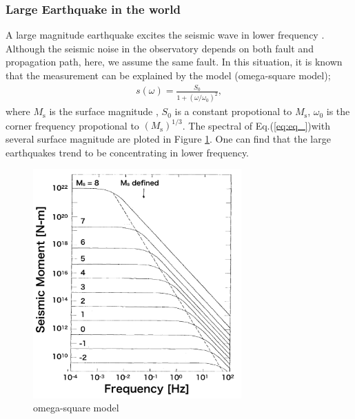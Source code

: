 \subsubsection{Large Earthquake in the world}
A large magnitude earthquake excites the seismic wave in lower frequency \cite{aki2002quantitative,aki1967scaling}. Although the seismic noise in the observatory depends on both fault and propagation path, here, we assume the same fault. In this situation, it is known that the measurement can be explained by the model (omega-square model);
\begin{eqnarray}
  s(\omega) = \displaystyle\frac{S_0}{1+({\omega}/{\omega_0})^2}, \label{eq:eq_}
\end{eqnarray}
where $M_{\mathrm{s}}$ is the surface magnitude \cite{gutenberg1945study}, $S_0$ is a constant propotional to $M_{\mathrm{s}}$, $\omega_0$ is the corner frequency propotional to $(M_{\mathrm{s}})^{1/3}$. The spectral of Eq.(\ref{eq:eq_})with several surface magnitude are ploted in Figure \ref{img:img328}. One can find that the large earthquakes trend to be concentrating in lower frequency.

\begin{figure}[h]
  \begin{center}   
    \includegraphics[width=8cm]{./img_chap3/img328.png}
    \caption{omega-square model \cite{aki1967scaling}}\label{img:img328}
  \end{center}
\end{figure}


\newpage
